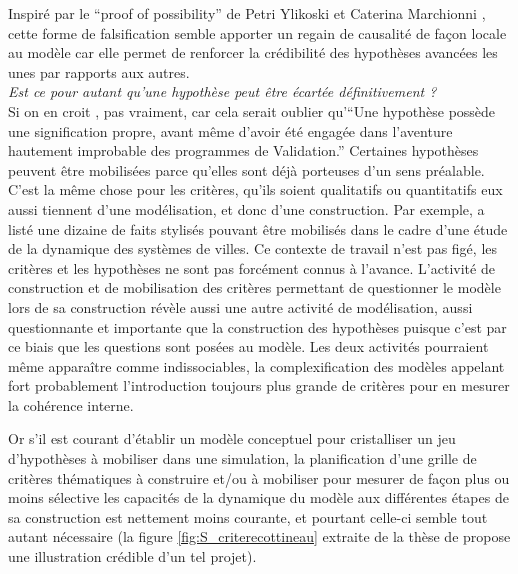 Inspiré par le \foreignquote{english}{proof of possibility} de Petri Ylikoski et Caterina Marchionni \autocite{Marchionni2013}, cette forme de falsification  semble apporter un regain de causalité de façon locale au modèle car elle permet de renforcer la crédibilité des hypothèses avancées les unes par rapports aux autres.
\\
\textit{Est ce pour autant qu'une hypothèse peut être écartée définitivement ?}
\\
Si on en croit \textcite[17]{Besse2000}, pas vraiment, car cela serait oublier qu'\enquote{Une hypothèse possède une signification propre, avant même d’avoir été engagée dans l’aventure hautement improbable des programmes de Validation.} Certaines hypothèses peuvent être mobilisées parce qu'elles sont déjà porteuses d'un sens préalable. C'est la même chose pour les critères, qu'ils soient qualitatifs ou quantitatifs eux aussi tiennent d'une modélisation, et donc d'une construction. Par exemple, \textcite[80]{Schmitt2014} a listé une dizaine de faits stylisés pouvant être mobilisés dans le cadre d'une étude de la dynamique des systèmes de villes. Ce contexte de travail n'est pas figé, les critères et les hypothèses ne sont pas forcément connus à l'avance. L'activité de construction et de mobilisation des critères permettant de questionner le modèle lors de sa construction révèle aussi une autre activité de modélisation, aussi questionnante et importante que la construction des hypothèses puisque c'est par ce biais que les questions sont posées au modèle. Les deux activités pourraient même apparaître comme indissociables, la complexification des modèles appelant fort probablement l'introduction toujours plus grande de critères pour en mesurer la cohérence interne.

Or s'il est courant d'établir un modèle conceptuel pour cristalliser un jeu d'hypothèses à mobiliser dans une simulation, la planification d'une grille de critères thématiques à construire et/ou à mobiliser pour mesurer de façon plus ou moins sélective les capacités de la dynamique du modèle aux différentes étapes de sa construction est nettement moins courante, et pourtant celle-ci semble tout autant nécessaire (la figure \ref{fig:S_criterecottineau} extraite de la thèse de \textcite{Cottineau2014b} propose une illustration crédible d'un tel projet).

